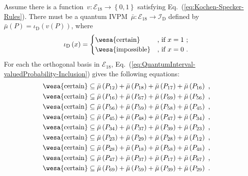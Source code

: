 \documentclass[english,reprint, aps, prl,superscriptaddress, showpacs,
showkeys, longbibliography, amsmath, amssymb]{revtex4-1}
\theoremstyle{plain}
\theoremstyle{definition}
\newcommand{\events}{\ensuremath{\mathcal{E}}}
\newcommand{\imposs}{{\text{\wesa{impossible}}}}
\newcommand{\necess}{{\text{\wesa{certain}}}}
\begin{document}
Assume there is a function~$v:\events_{18}\rightarrow\left\{ 0,1\right\} $
satisfying Eq.~(\ref{eq:Kochen-Specker-Rules}). There must be a
quantum IVPM~$\bar{\mu}:\events_{18}\rightarrow\mathscr{I}_{\mathrm{D}}$
defined by $\bar{\mu}\left(P\right)=\iota_{\mathrm{D}}\left(v\left(P\right)\right)$,
where 
\begin{equation}
\iota_{\mathrm{D}}\left(x\right)=\begin{cases}
\necess & \text{, if }x=1\text{ ;}\\
\imposs & \text{, if }x=0\text{ .}
\end{cases}\label{eq:homomorphism-0}
\end{equation}
For each the orthogonal basis in $\events_{18}$, Eq.~(\ref{eq:QuantumInterval-valuedProbability-Inclusion})
gives the following equations: 
\begin{equation}
\begin{aligned}\necess & \subseteq\bar{\mu}\left(P_{12}\right)+\bar{\mu}\left(P_{18}\right)+\bar{\mu}\left(P_{17}\right)+\bar{\mu}\left(P_{16}\right)\textrm{ ,}\\
\necess & \subseteq\bar{\mu}\left(P_{16}\right)+\bar{\mu}\left(P_{67}\right)+\bar{\mu}\left(P_{69}\right)+\bar{\mu}\left(P_{56}\right)\textrm{ ,}\\
\necess & \subseteq\bar{\mu}\left(P_{56}\right)+\bar{\mu}\left(P_{59}\right)+\bar{\mu}\left(P_{58}\right)+\bar{\mu}\left(P_{45}\right)\textrm{ ,}\\
\necess & \subseteq\bar{\mu}\left(P_{45}\right)+\bar{\mu}\left(P_{48}\right)+\bar{\mu}\left(P_{47}\right)+\bar{\mu}\left(P_{34}\right)\textrm{ ,}\\
\necess & \subseteq\bar{\mu}\left(P_{34}\right)+\bar{\mu}\left(P_{37}\right)+\bar{\mu}\left(P_{39}\right)+\bar{\mu}\left(P_{23}\right)\textrm{ ,}\\
\necess & \subseteq\bar{\mu}\left(P_{23}\right)+\bar{\mu}\left(P_{29}\right)+\bar{\mu}\left(P_{28}\right)+\bar{\mu}\left(P_{12}\right)\textrm{ ,}\\
\necess & \subseteq\bar{\mu}\left(P_{28}\right)+\bar{\mu}\left(P_{18}\right)+\bar{\mu}\left(P_{58}\right)+\bar{\mu}\left(P_{48}\right)\textrm{ ,}\\
\necess & \subseteq\bar{\mu}\left(P_{47}\right)+\bar{\mu}\left(P_{37}\right)+\bar{\mu}\left(P_{17}\right)+\bar{\mu}\left(P_{67}\right)\textrm{ ,}\\
\necess & \subseteq\bar{\mu}\left(P_{69}\right)+\bar{\mu}\left(P_{59}\right)+\bar{\mu}\left(P_{39}\right)+\bar{\mu}\left(P_{29}\right)\textrm{ .}
\end{aligned}
\label{eq:CEGA}
\end{equation}
\end{document}
